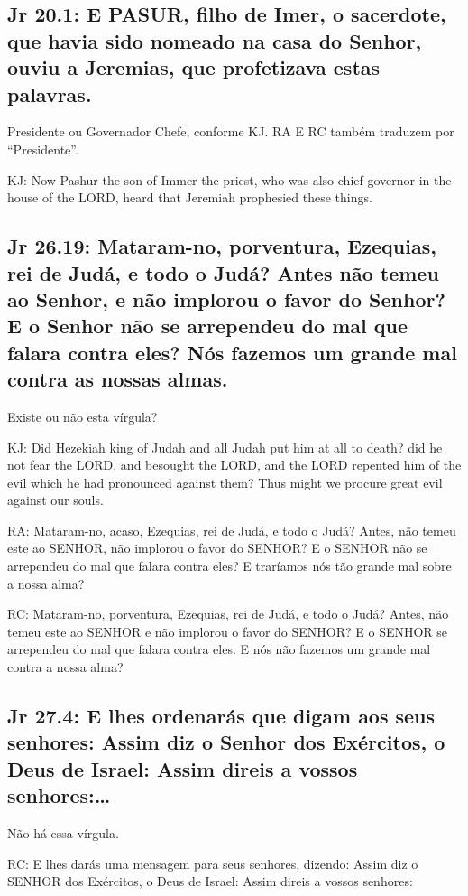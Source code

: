 \subsection{Jr 20.1: E PASUR, filho de Imer, o sacerdote, que havia sido nomeado  na casa do Senhor, ouviu a Jeremias, que profetizava estas palavras.}

Presidente ou Governador Chefe, conforme KJ. RA E RC também traduzem por ``Presidente''.

KJ: Now Pashur the son of Immer the priest, who was also chief governor in the house of the LORD, heard that Jeremiah prophesied these things.

\subsection{Jr  26.19: Mataram-no, porventura, Ezequias, rei de Judá, e todo o Judá? Antes não temeu ao Senhor, e não implorou o favor do Senhor? E o Senhor não se arrependeu do mal que falara contra eles? Nós\uwave{,} fazemos um grande mal contra as nossas almas.}

Existe ou não esta vírgula?

KJ: Did Hezekiah king of Judah and all Judah put him at all to death? did he not fear the LORD, and besought the LORD, and the LORD repented him of the evil which he had pronounced against them? Thus might we procure great evil against our souls.

RA: Mataram-no, acaso, Ezequias, rei de Judá, e todo o Judá? Antes, não temeu este ao SENHOR, não implorou o favor do SENHOR? E o SENHOR não se arrependeu do mal que falara contra eles? E traríamos nós tão grande mal sobre a nossa alma?

RC: Mataram-no, porventura, Ezequias, rei de Judá, e todo o Judá? Antes, não temeu este ao SENHOR e não implorou o favor do SENHOR? E o SENHOR se arrependeu do mal que falara contra eles. E nós não fazemos um grande mal contra a nossa alma?

\subsection{Jr 27.4: E lhes ordenarás\uwave{,} que digam aos seus senhores: Assim diz o Senhor dos Exércitos, o Deus de Israel: Assim direis a vossos senhores:\ldots}
Não há essa vírgula.

RC: E lhes darás uma mensagem para seus senhores, dizendo: Assim diz o SENHOR dos Exércitos, o Deus de Israel: Assim direis a vossos senhores:

